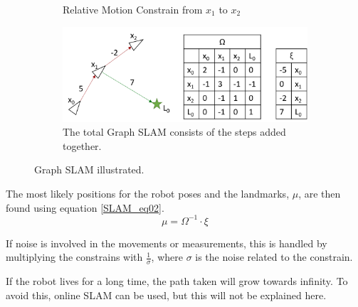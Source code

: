 \begin{figure}[H]
\begin{subfigure}{.5\textwidth}
  \caption{Relative Motion Constrain from $x_1$ to $x_2$}
  \label{SLAM_fig04:sub4}
\end{subfigure}
\begin{subfigure}{.5\textwidth}
  \centering
  \includegraphics[width=.8\linewidth]{billeder/GraphSLAM04_5.png}
  \caption{The total Graph SLAM consists of the steps added together.}
  \label{SLAM_fig04:sub5}
\end{subfigure}
\caption{Graph SLAM illustrated.}
\label{SLAM_fig04}
\end{figure}

The most likely positions for the robot poses and the landmarks, $\mu$, are then found using equation \ref{SLAM_eq02}. 
\begin{equation}
\mu = \Omega^{-1} \cdot \xi
\label{SLAM_eq02}
\end{equation}

If noise is involved in the movements or measurements, this is handled by multiplying the constrains with $\frac{1}{\sigma}$, where $\sigma$ is the noise related to the constrain.

If the robot lives for a long time, the path taken will grow towards infinity. To avoid this, online SLAM can be used, but this will not be explained here.

